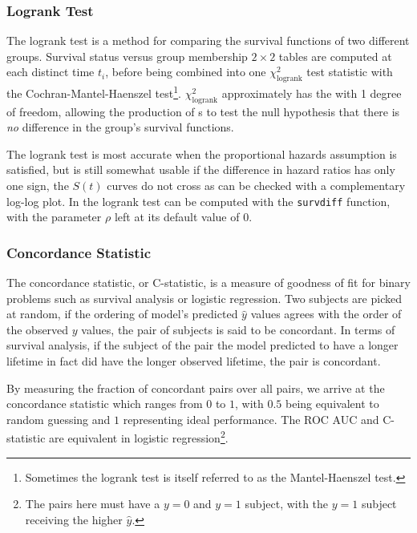 \subsubsection{Logrank Test}
\label{additional:Survival:additional:logrank}

The logrank test is a method for comparing the survival functions of two different groups.
Survival status versus group membership $2\times2$ tables are computed at each distinct time $t_{i}$,
before being combined into one $\chi_{\text{logrank}}^{2}$ test statistic
with the Cochran-Mantel-Haenszel test\footnote{Sometimes
the logrank test is itself referred to as the Mantel-Haenszel test.}.
$\chi_{\text{logrank}}^{2}$ approximately has the \chiSqdist with 1 degree of freedom,
allowing the production of {\pvalue}s to test the null hypothesis
that there is {\em no} difference in the group's survival functions.

The logrank test is most accurate when the proportional hazards assumption is satisfied,
but is still somewhat usable if the difference in hazard ratios has only one sign,
\ie the $S\left(t\right)$ curves do not cross as can be checked with a complementary log-log plot.
In \R the logrank test can be computed with the \texttt{survdiff} function,
with the parameter $\rho$ left at its default value of $0$.

\subsubsection{Concordance Statistic}
\label{additional:Survival:additional:concordance}

The concordance statistic, or C-statistic, is a measure of goodness of fit
for binary problems such as survival analysis or logistic regression.
Two subjects are picked at random, if the ordering of model's predicted $\hat{y}$ values
agrees with the order of the observed $y$ values, the pair of subjects is said to be concordant.
In terms of survival analysis, if the subject of the pair the model predicted to have a longer lifetime
in fact did have the longer observed lifetime, the pair is concordant.

By measuring the fraction of concordant pairs over all pairs,
we arrive at the concordance statistic which ranges from $0$ to $1$,
with $0.5$ being equivalent to random guessing and $1$ representing ideal performance.
The ROC AUC and C-statistic are equivalent in
logistic regression\footnote{The pairs here must have a $y=0$ and $y=1$ subject, with the $y=1$ subject receiving the higher $\hat{y}$.}.

